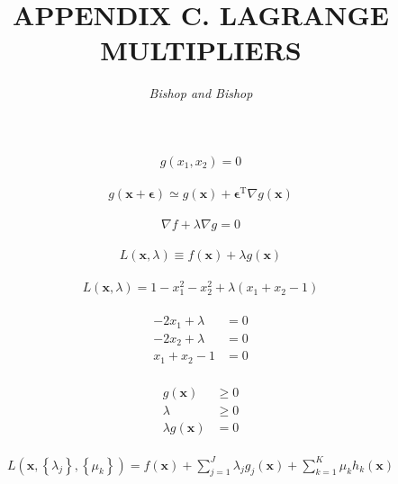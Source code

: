 \documentclass{article}
\title{\LARGE\scshape\MakeUppercase{Appendix C. Lagrange Multipliers}}
\author{\textit{Bishop and Bishop}}
\date{}
\begin{document}
\maketitle

\begin{align*}
g\left(x_{1}, x_{2}\right)=0 
\tag{C.1}
\end{align*}

\begin{align*}
g(\mathbf{x}+\boldsymbol{\epsilon}) \simeq g(\mathbf{x})+\boldsymbol{\epsilon}^{\mathrm{T}} \nabla g(\mathbf{x}) 
\tag{C.2}
\end{align*}

\begin{align*}
\nabla f+\lambda \nabla g=0 
\tag{C.3}
\end{align*}

\begin{align*}
L(\mathbf{x}, \lambda) \equiv f(\mathbf{x})+\lambda g(\mathbf{x}) 
\tag{C.4}
\end{align*}

\begin{align*}
L(\mathbf{x}, \lambda)=1-x_{1}^{2}-x_{2}^{2}+\lambda\left(x_{1}+x_{2}-1\right) 
\tag{C.5}
\end{align*}

\begin{align*}
\begin{aligned}
-2 x_{1}+\lambda & =0  \tag{C.6}\\
-2 x_{2}+\lambda & =0  \tag{C.7}\\
x_{1}+x_{2}-1 & =0 
\end{aligned}
\tag{C.8}
\end{align*}

\begin{align*}
\begin{aligned}
g(\mathbf{x}) & \geqslant 0  \tag{C.9}\\
\lambda & \geqslant 0  \tag{C.10}\\
\lambda g(\mathbf{x}) & =0
\end{aligned}
\tag{C.11}
\end{align*}

\begin{align*}
L\left(\mathbf{x},\left\{\lambda_{j}\right\},\left\{\mu_{k}\right\}\right)=f(\mathbf{x})+\sum_{j=1}^{J} \lambda_{j} g_{j}(\mathbf{x})+\sum_{k=1}^{K} \mu_{k} h_{k}(\mathbf{x}) 
\tag{C.12}
\end{align*}
\end{document}
